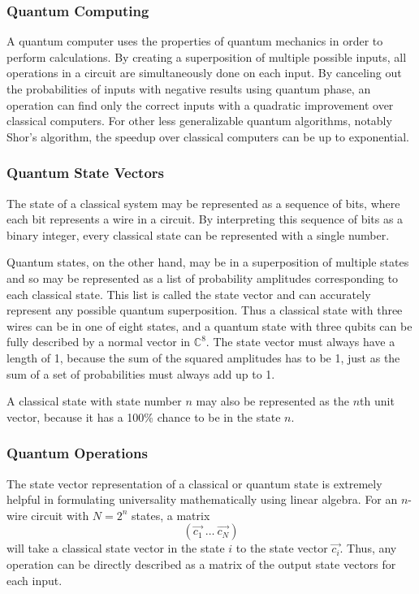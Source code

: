 \documentclass[12pt]{article}
\begin{document}
\subsubsection{Quantum Computing}
A quantum computer uses the properties of quantum mechanics in order to perform calculations. By creating a superposition of multiple possible inputs, all operations in a circuit are simultaneously done on each input. By canceling out the probabilities of inputs with negative results using quantum phase, an operation can find only the correct inputs with a quadratic improvement over classical computers. For other less generalizable quantum algorithms, notably Shor's algorithm, the speedup over classical computers can be up to exponential.

\subsubsection{Quantum State Vectors}
The state of a classical system may be represented as a sequence of bits, where each bit represents a wire in a circuit. By interpreting this sequence of bits as a binary integer, every classical state can be represented with a single number.

Quantum states, on the other hand, may be in a superposition of multiple states and so may be represented as a list of probability amplitudes corresponding to each classical state. This list is called the state vector and can accurately represent any possible quantum superposition. Thus a classical state with three wires can be in one of eight states, and a quantum state with three qubits can be fully described by a normal vector in $\mathbb{C}^8$. The state vector must always have a length of 1, because the sum of the squared amplitudes has to be 1, just as the sum of a set of probabilities must always add up to 1.

A classical state with state number $n$ may also be represented as the $n$th unit vector, because it has a 100\% chance to be in the state $n$.

\subsubsection{Quantum Operations}
The state vector representation of a classical or quantum state is extremely helpful in formulating universality mathematically using linear algebra. For an $n$-wire circuit with $N=2^n$ states, a matrix
$$
(\vec{c_{1}} \: \dots \: \vec{c_{N}})
$$
will take a classical state vector in the state $i$ to the state vector $\vec{c_{i}}$. Thus, any operation can be directly described as a matrix of the output state vectors for each input.
\end{document}
